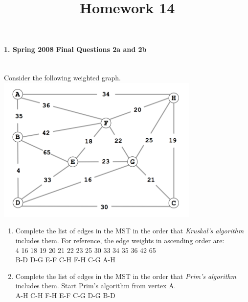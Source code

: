 \documentclass{article}
\begin{document}
\title{Homework 14}
\date{}
\maketitle


\paragraph{\Large 1. Spring 2008 Final Questions 2a and 2b}\mbox{}\\
Consider the following weighted graph.\\
\includegraphics[]{fin-s08-2.png}\\
\begin{enumerate}
\renewcommand{\theenumi}{\Alph{enumi}}
	\item Complete the list of edges in the MST in the order that \textit{Kruskal's algorithm} includes them. For reference, the edge weights in ascending order are:\\
	4  16  18  19  20  21  22  23  25  30  33  34  35  36  42  65\\

	B-D D-G E-F C-H F-H C-G A-H

	\item Complete the list of edges in the MST in the order that \textit{Prim's algorithm} includes them. Start Prim's algorithm from vertex A.\\

	A-H C-H F-H E-F C-G D-G B-D 

\end{enumerate}
\end{document}
